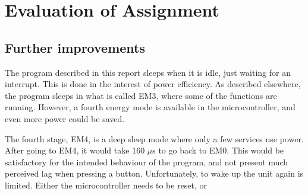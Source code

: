 \section{Evaluation of Assignment}


\subsection{Further improvements}
The program described in this report sleeps when it is idle, just waiting for an interrupt.
This is done in the interest of power efficiency.
As described elsewhere, the program sleeps in what is called EM3, where some of the functions are running.
However, a fourth energy mode is available in the microcontroller, and even more power could be saved.

The fourth stage, EM4, is a deep sleep mode where only a few services use power.
After going to EM4, it would take 160 $\mu$s to go back to EM0.
This would be satisfactory for the intended behaviour of the program, and not present much perceived lag when pressing a button.
Unfortunately, to wake up the unit again is limited.
Either the microcontroller needs to be reset, or 
